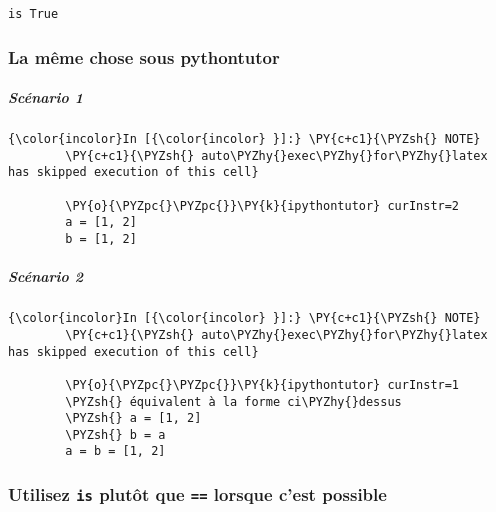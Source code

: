     \begin{Verbatim}[commandchars=\\\{\},frame=single,framerule=0.3mm,rulecolor=\color{cellframecolor}]
is True
\end{Verbatim}

    \hypertarget{la-muxeame-chose-sous-pythontutor}{%
\subsubsection{La même chose sous
pythontutor}\label{la-muxeame-chose-sous-pythontutor}}

    \hypertarget{scuxe9nario-1}{%
\subparagraph{Scénario 1}\label{scuxe9nario-1}}

    \begin{Verbatim}[commandchars=\\\{\},frame=single,framerule=0.3mm,rulecolor=\color{cellframecolor}]
{\color{incolor}In [{\color{incolor} }]:} \PY{c+c1}{\PYZsh{} NOTE}
        \PY{c+c1}{\PYZsh{} auto\PYZhy{}exec\PYZhy{}for\PYZhy{}latex has skipped execution of this cell}
        
        \PY{o}{\PYZpc{}\PYZpc{}}\PY{k}{ipythontutor} curInstr=2
        a = [1, 2]
        b = [1, 2]
\end{Verbatim}


    \hypertarget{scuxe9nario-2}{%
\subparagraph{Scénario 2}\label{scuxe9nario-2}}

    \begin{Verbatim}[commandchars=\\\{\},frame=single,framerule=0.3mm,rulecolor=\color{cellframecolor}]
{\color{incolor}In [{\color{incolor} }]:} \PY{c+c1}{\PYZsh{} NOTE}
        \PY{c+c1}{\PYZsh{} auto\PYZhy{}exec\PYZhy{}for\PYZhy{}latex has skipped execution of this cell}
        
        \PY{o}{\PYZpc{}\PYZpc{}}\PY{k}{ipythontutor} curInstr=1
        \PYZsh{} équivalent à la forme ci\PYZhy{}dessus
        \PYZsh{} a = [1, 2]
        \PYZsh{} b = a
        a = b = [1, 2]
\end{Verbatim}


    \hypertarget{utilisez-is-plutuxf4t-que-lorsque-cest-possible}{%
\subsubsection{\texorpdfstring{Utilisez \texttt{is} plutôt que
\texttt{==} lorsque c'est
possible}{Utilisez is plutôt que == lorsque c'est possible}}\label{utilisez-is-plutuxf4t-que-lorsque-cest-possible}}

